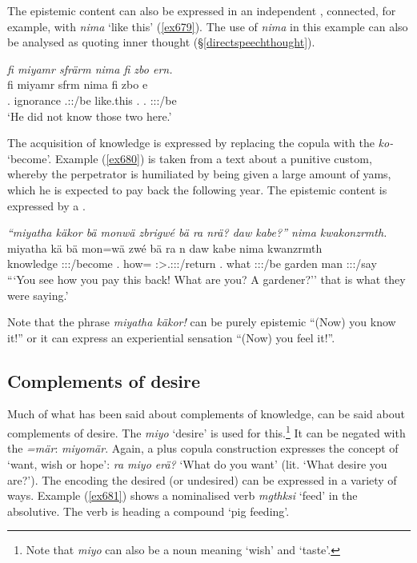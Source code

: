 The epistemic content can also be expressed in an independent , connected, for example, with \emph{nima} `like this' (\ref{ex679}). The use of \emph{nima} in this example can also be analysed as quoting inner thought ({\S}\ref{directspeechthought}).

\begin{exe}
	\ex \emph{fi miyamr sfrärm nima fi zbo ern.}\\
	\gll fi miyamr sfrm nima fi zbo e\\
	\Third.{\Abs} ignorance \Tsg.\Masc:\Sbj\Pst:\Dur/be {like.this} \Third.{\Abs} \Prox.{\All} \Stdu:\Sbj:\Nonpast:\Ipfv/be\\
	\trans `He did not know those two here.'
	\label{ex679}
\end{exe}

The acquisition of knowledge is expressed by replacing the copula with the  \emph{ko-} `become'. Example (\ref{ex680}) is taken from a text about a punitive custom, whereby the perpetrator is humiliated by being given a large amount of yams, which he is expected to pay back the following year. The epistemic content is expressed by a .

\begin{exe}
	\ex \emph{``miyatha käkor bä monwä zbrigwé bä ra nrä? daw kabe?'' nima kwakonzrmth.}\\
	\gll miyatha kä bä mon=wä zwé bä ra n daw kabe nima kwanzrmth\\
	knowledge \Ssg:\Sbj:\Imp:\Pfv/become \Second.{\Abs} how={\Emph} \Ssg:\Sbj>\Tsg.\F:\Sbj:\Imp:\Ipfv/return \Second.{\Abs} what \Ssg:\Sbj:\Nonpast:\Ipfv/be garden man {\Quot} \Stpl:\Sbj:\Pst:\Dur/say\\
	\trans ```You see how you pay this back! What are you? A gardener?'' that is what they were saying.'
	\label{ex680}
\end{exe}

Note that the phrase \emph{miyatha käkor!} can be purely epistemic ``(Now) you know it!'' or it can express an experiential sensation ``(Now) you feel it!''.

\subsection{Complements of desire}\label{compldesire}

Much of what has been said about complements of knowledge, can be said about complements of desire. The  \emph{miyo} `desire' is used for this.\footnote{Note that \emph{miyo} can also be a noun meaning `wish' and `taste'.} It can be negated with the   \emph{=mär}: \emph{miyomär}. Again, a  plus copula construction expresses the concept of `want, wish or hope': \emph{ra miyo erä?} `What do you want' (lit. `What desire you are?'). The  encoding the desired (or undesired) can be expressed in a variety of ways. Example (\ref{ex681}) shows a nominalised verb \emph{mgthksi} `feed' in the absolutive. The verb is heading a compound `pig feeding'.

